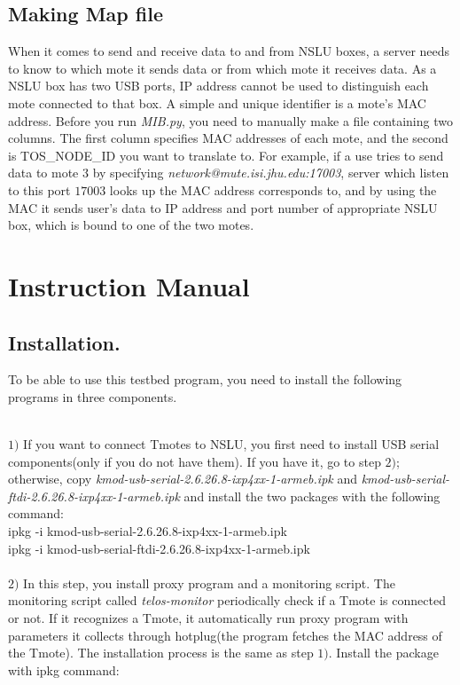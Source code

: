 \documentclass[10pt,conference]{IEEEtran}
\newcommand\spar[1]{\vspace{1ex}\noindent{\bf #1}}
\begin{document}
\subsection{Making Map file} \label{sec:map} When it comes to send and receive
data to and from NSLU boxes, a server needs to know to which mote it sends data
or from which mote it receives data.  As a NSLU box has two USB ports, IP
address cannot be used to distinguish each mote connected to that box.  A
simple and unique identifier is a mote's MAC address.  Before you run
\textit{MIB.py}, you need to manually make a file containing two columns.  The
first column specifies MAC addresses of each mote, and the second is
TOS\_NODE\_ID you want to translate to.  For example, if a use tries to send
data to mote $3$ by specifying \textit{network@mute.isi.jhu.edu:17003}, server
which listen to this port $17003$ looks up the MAC address corresponds to, and
by using the MAC it sends user's data to IP address and port number of
appropriate NSLU box, which is bound to one of the two motes.

\section{Instruction Manual}

\subsection{Installation.} \label{sec:install}To be able to use this testbed
program, you need to install the following programs in three components.

\spar{1. NSLU}\\
$1)$ If you want to connect Tmotes to NSLU, you first need to install USB
serial components(only if you do not have them).  If you have it, go to step
$2)$; otherwise, copy \textit{kmod-usb-serial-2.6.26.8-ixp4xx-1-armeb.ipk} and
\textit{kmod-usb-serial-ftdi-2.6.26.8-ixp4xx-1-armeb.ipk} and install the two
packages with the following command: \\

ipkg -i kmod-usb-serial-2.6.26.8-ixp4xx-1-armeb.ipk \\

ipkg -i kmod-usb-serial-ftdi-2.6.26.8-ixp4xx-1-armeb.ipk\\\\
$2)$ In this step, you install proxy program and a monitoring script.  The
monitoring script called \textit{telos-monitor} periodically check if a Tmote
is connected or not.  If it recognizes a Tmote, it automatically run proxy
program with parameters it collects through hotplug(the program fetches 
the MAC address of the Tmote). The installation process is the same as step $1)$. 
Install the package with ipkg command: \\
\end{document}
